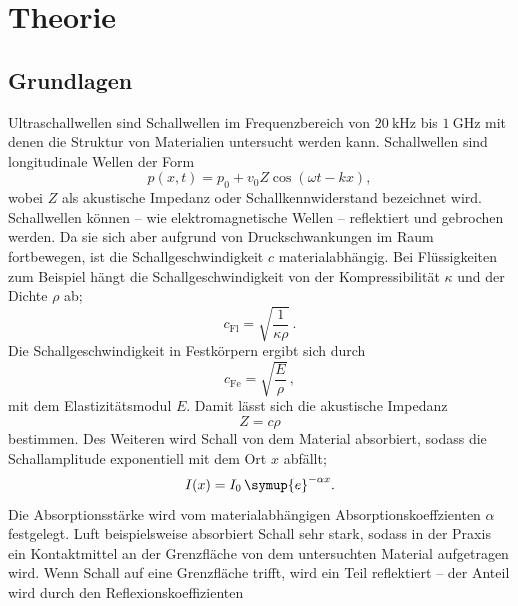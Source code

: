 \section{Theorie}
\label{sec:Theorie}

\subsection{Grundlagen}
Ultraschallwellen sind Schallwellen im Frequenzbereich von $\SI{20}{\kilo\hertz}$ bis
$\SI{1}{\giga\hertz}$ mit denen die Struktur von Materialien untersucht werden kann.
Schallwellen sind longitudinale Wellen der Form
\begin{equation}
	p(x,t) = p_0 + v_0 Z \cos(\omega t - kx) \mathrm{,}
\end{equation}
wobei $Z$ als akustische Impedanz oder Schallkennwiderstand bezeichnet wird.
Schallwellen können -- wie elektromagnetische Wellen -- reflektiert und gebrochen werden.
Da sie sich aber aufgrund von Druckschwankungen im Raum fortbewegen, ist die
Schallgeschwindigkeit $c$ materialabhängig. Bei Flüssigkeiten zum Beispiel hängt die
Schallgeschwindigkeit von der Kompressibilität $\kappa$ und der Dichte $\rho$ ab;
\begin{equation}
	c_{\mathrm{Fl}} = \sqrt{\frac{1}{\kappa\rho}} \, \mathrm{.}
\end{equation}
Die Schallgeschwindigkeit in Festkörpern ergibt sich durch
\begin{equation}
	c_{\mathrm{Fe}} = \sqrt{\frac{E}{\rho}} \, \mathrm{,}
\end{equation}
mit dem Elastizitätsmodul $E$.
Damit lässt sich die akustische Impedanz
\begin{equation}
	Z=c \rho
\end{equation}
bestimmen.
Des Weiteren wird Schall von dem Material absorbiert, sodass die Schallamplitude exponentiell
mit dem Ort $x$ abfällt;
\begin{equation}
	\label{eqn:dampf}
	I(x) = I_0 \, \symup{e}^{-\alpha x} \mathrm{.}
\end{equation}
Die Absorptionsstärke wird vom materialabhängigen Absorptionskoeffzienten $\alpha$ festgelegt.
Luft beispielsweise absorbiert Schall sehr stark, sodass in der Praxis ein Kontaktmittel an der
Grenzfläche von dem untersuchten Material aufgetragen wird.
Wenn Schall auf eine Grenzfläche trifft, wird ein Teil reflektiert -- der Anteil wird durch den
Reflexionskoeffizienten
